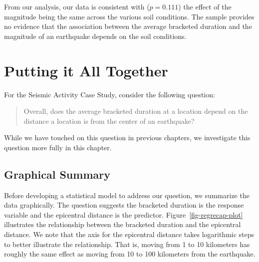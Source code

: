 \documentclass[
  letterpaper,
  DIV=11,
  numbers=noendperiod]{scrreprt}
\theoremstyle{plain}
\theoremstyle{definition}
\theoremstyle{definition}
\theoremstyle{remark}
\begin{document}
\begin{table}

\caption{\label{tbl-regextensions-anova}Table partitioning the sources
of variability corresponding to testing whether the effect of the
magnitude of an earthquake on the resulting bracketed duration differs
across soil conditions.}


\end{table}%

From our analysis, our data is consistent with (\(p = 0.111\)) the
effect of the magnitude being the same across the various soil
conditions. The sample provides no evidence that the association between
the average bracketed duration and the magnitude of an earthquake
depends on the soil conditions.

\chapter{Putting it All Together}\label{sec-regrecap}

For the Seismic Activity Case Study, consider the following question:

\begin{quote}
Overall, does the average bracketed duration at a location depend on the
distance a location is from the center of an earthquake?
\end{quote}

While we have touched on this question in previous chapters, we
investigate this question more fully in this chapter.

\section{Graphical Summary}\label{graphical-summary}

Before developing a statistical model to address our question, we
summarize the data graphically. The question suggests the bracketed
duration is the response variable and the epicentral distance is the
predictor. Figure~\ref{fig-regrecap-plot} illustrates the relationship
between the bracketed duration and the epicentral distance. We note that
the axis for the epicentral distance takes logarithmic steps to better
illustrate the relationship. That is, moving from 1 to 10 kilometers has
roughly the same effect as moving from 10 to 100 kilometers from the
earthquake.
\end{document}
